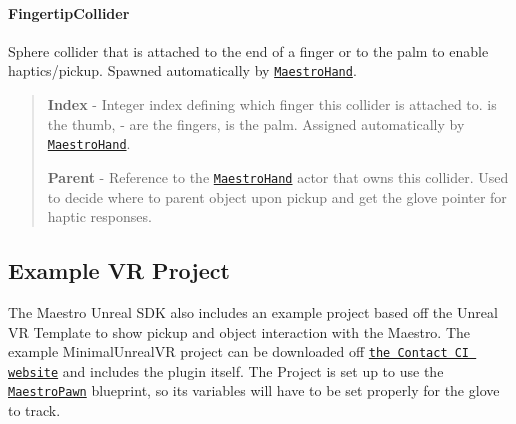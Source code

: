 \paragraph*{Fingertip\+Collider}

Sphere collider that is attached to the end of a finger or to the palm to enable haptics/pickup. Spawned automatically by \href{#maestrohand}{\tt Maestro\+Hand}. \begin{quote}
{\bfseries Index} -\/ Integer index defining which finger this collider is attached to. {} is the thumb, {}-\/{} are the fingers, {} is the palm. Assigned automatically by \href{#maestrohand}{\tt Maestro\+Hand}.

{\bfseries Parent} -\/ Reference to the \href{#maestrohand}{\tt Maestro\+Hand} actor that owns this collider. Used to decide where to parent object upon pickup and get the glove pointer for haptic responses. \end{quote}


\subsection*{Example VR Project}

The Maestro Unreal S\+DK also includes an example project based off the Unreal VR Template to show pickup and object interaction with the Maestro. The example {\ttfamily Minimal\+Unreal\+VR} project can be downloaded off \href{https://contactci.co}{\tt the Contact CI website} and includes the plugin itself. The Project is set up to use the \href{#maestropawn}{\tt Maestro\+Pawn} blueprint, so it\textquotesingle{}s variables will have to be set properly for the glove to track. 